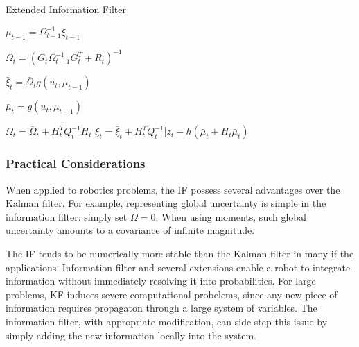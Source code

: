 \begin{algorithm}[H]
\caption{Extended Information Filter}

\BlankLine
{}
$\mu_{t-1} = \Omega_{t-1}^{-1} \xi_{t-1} $\;

\BlankLine


$\bar{\Omega}_t = (G_t \Omega_{t-1}^{-1} G_t^T + R_t)^{-1}$\;

$\bar{\xi}_t = \bar{\Omega}_t g(u_t, \mu_{t-1})$\;

$\bar{\mu}_t = g(u_t, \mu_{t-1})$\;

\BlankLine
{}

$\Omega_t = \bar{\Omega}_t + H_t^T Q_t^{-1} H_t $\;
$\xi_t = \bar{\xi}_t + H_t^T Q_t^{-1} [z_t -h(\bar{\mu}_t + H_t \bar{\mu}_t) $\;

\BlankLine
{}
\end{algorithm}

\vspace{2mm}

\subsubsection{Practical Considerations}

When applied to robotics problems, the IF possess several advantages over the Kalman filter.
For example, representing global uncertainty is simple in the information filter: simply set $\Omega = 0$.
When using moments, such global uncertainty amounts to a covariance of infinite magnitude.

The IF tends to be numerically more stable than the Kalman filter in many if the applications.
Information filter and several extensions enable a robot to integrate information without immediately resolving it into probabilities.
For large problems, KF induces severe computational probelems, since any new piece of information requires propagaton through a large system of variables.
The information filter, with appropriate modification, can side-step this issue by simply adding the new information locally into the system.

\newpage
